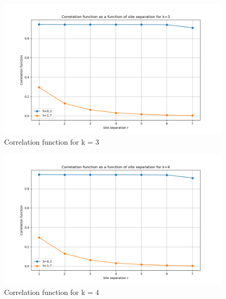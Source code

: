 \documentclass[12pt]{article}
\begin{document}
\begin{figure}
    \centering
    \includegraphics[width=\textwidth]{5-5_correlation_k3.png}
    \caption{Correlation function for k = 3}
\end{figure}
\begin{figure}
    \centering
    \includegraphics[width=\textwidth]{5-5_correlation_k4.png}
    \caption{Correlation function for k = 4}
\end{figure}
\end{document}
